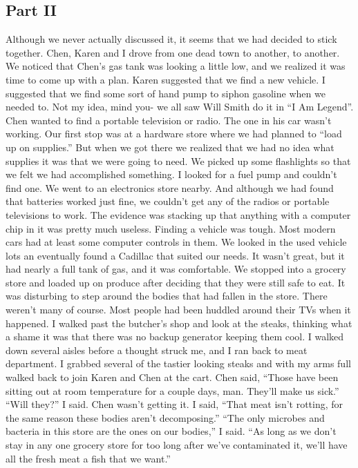\documentclass[a4paper]{article}
\begin{document}
\subsection{Part II}
Although we never actually discussed it, it seems that we had decided to stick together. Chen, Karen and I drove from one dead town to another, to another. We noticed that Chen’s gas tank was looking a little low, and we realized it was time to come up with a plan.
Karen suggested that we find a new vehicle. I suggested that we find some sort of hand pump to siphon gasoline when we needed to. Not my idea, mind you- we all saw Will Smith do it in “I Am Legend”. Chen wanted to find a portable television or radio. The one in his car wasn’t working.
Our first stop was at a hardware store where we had planned to “load up on supplies.” But when we got there we realized that we had no idea what supplies it was that we were going to need. We picked up some flashlights so that we felt we had accomplished something. I looked for a fuel pump and couldn’t find one.
We went to an electronics store nearby. And although we had found that batteries worked just fine, we couldn’t get any of the radios or portable televisions to work. The evidence was stacking up that anything with a computer chip in it was pretty much useless.
Finding a vehicle was tough. Most modern cars had at least some computer controls in them. We looked in the used vehicle lots an eventually found a Cadillac that suited our needs. It wasn’t great, but it had nearly a full tank of gas, and it was comfortable.
We stopped into a grocery store and loaded up on produce after deciding that they were still safe to eat. It was disturbing to step around the bodies that had fallen in the store. There weren’t many of course. Most people had been huddled around their TVs when it happened.
I walked past the butcher’s shop and look at the steaks, thinking what a shame it was that there was no backup generator keeping them cool. I walked down several aisles before a thought struck me, and I ran back to meat department. I grabbed several of the tastier looking steaks and with my arms full walked back to join Karen and Chen at the cart.
Chen said, “Those have been sitting out at room temperature for a couple days, man. They’ll make us sick.”
“Will they?” I said.
Chen wasn’t getting it. I said, “That meat isn’t rotting, for the same reason these bodies aren’t decomposing.”
“The only microbes and bacteria in this store are the ones on our bodies,” I said. “As long as we don’t stay in any one grocery store for too long after we’ve contaminated it, we’ll have all the fresh meat a fish that we want.”
\end{document}
